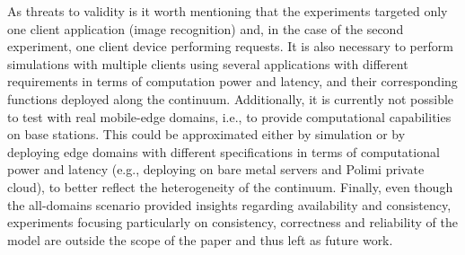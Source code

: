As threats to validity is it worth mentioning that the experiments targeted only one client application (image recognition) and, in the case of the second experiment, one client device performing requests. It is also necessary to perform simulations with multiple clients using several applications with different requirements in terms of computation power and latency, and their corresponding functions deployed along the continuum. Additionally, it is currently not possible to test with real mobile-edge domains, i.e., to provide computational capabilities on base stations. This could be approximated either by simulation or by deploying edge domains with different specifications in terms of computational power and latency (e.g., deploying on bare metal servers and Polimi private cloud), to better reflect the heterogeneity of the continuum. Finally, even though the all-domains scenario provided insights regarding availability and consistency, experiments focusing particularly on consistency, correctness and reliability of the model are outside the scope of the paper and thus left as future work.



